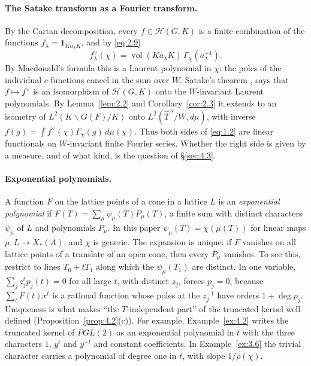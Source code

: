 \documentclass[12pt,letterpaper]{article}
\numberwithin{equation}{section}
\theoremstyle{plain}
\theoremstyle{remark}
\theoremstyle{plain}
\theoremstyle{definition}
\theoremstyle{remark}
\theoremstyle{remark}
\newcommand{\Hc}{\mathcal{H}}
\newcommand{\Thu}{\widehat{T}^{\,u}}
\DeclareMathOperator{\vol}{vol}
\newcommand{\one}{\mathbf 1}
\begin{document}
\paragraph{The Satake transform as a Fourier transform.} By the Cartan decomposition, every $f\in\Hc(G,K)$ is a finite combination of the functions $f_\lambda=\one_{Ka_\lambda K}$, and by \eqref{eq:2.9}
\[
f_\lambda^\vee(\chi)=\vol(Ka_\lambda K)\,\Gamma_\chi(a_\lambda^{-1}).
\]
By Macdonald's formula this is a Laurent polynomial in $\chi$: the poles of the individual $c$-functions cancel in the sum over $W$. Satake's theorem \cite{Sa63}, \cite[\S4]{Ca79} says that $f\mapsto f^\vee$ is an isomorphism of $\Hc(G,K)$ onto the $W$-invariant Laurent polynomials. By Lemma~\ref{lem:2.2} and Corollary~\ref{cor:2.3} it extends to an isometry of $L^2(K\backslash G(F)/K)$ onto $L^2(\Thu/W,d\mu)$, with inverse $f(g)=\int f^\vee(\chi)\Gamma_\chi(g)\,d\mu(\chi)$. Thus both sides of \eqref{eq:1.2} are linear functionals on $W$-invariant finite Fourier series. Whether the right side is given by a measure, and of what kind, is the question of \S\ref{sec:4.3}.

\paragraph{Exponential polynomials.} A function $F$ on the lattice points of a cone in a lattice $L$ is an \emph{exponential polynomial} if $F(T)=\sum_\mu\psi_\mu(T)P_\mu(T)$, a finite sum with distinct characters $\psi_\mu$ of $L$ and polynomials $P_\mu$. In this paper $\psi_\mu(T)=\chi(\mu(T))$ for linear maps $\mu:L\to X_*(A)$, and $\chi$ is generic. The expansion is unique: if $F$ vanishes on all lattice points of a translate of an open cone, then every $P_\mu$ vanishes. To see this, restrict to lines $T_0+tT_1$ along which the $\psi_\mu(T_1)$ are distinct. In one variable, $\sum_jz_j^tp_j(t)=0$ for all large $t$, with distinct $z_j$, forces $p_j=0$, because $\sum_tF(t)x^t$ is a rational function whose poles at the $z_j^{-1}$ have orders $1+\deg p_j$. Uniqueness is what makes ``the $T$-independent part'' of the truncated kernel well defined (Proposition~\ref{prop:4.2}(c)). For example, Example~\ref{ex:4.2} writes the truncated kernel of $PGL(2)$ as an exponential polynomial in $t$ with the three characters $1$, $y^t$ and $y^{-t}$ and constant coefficients. In Example~\ref{ex:3.6} the trivial character carries a polynomial of degree one in $t$, with slope $1/\rho(\chi)$.
\end{document}
